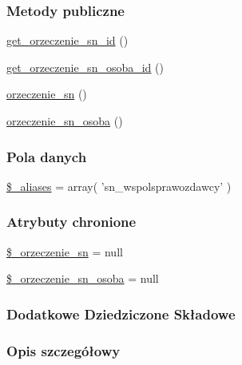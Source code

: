 \subsubsection*{Metody publiczne}
\begin{DoxyCompactItemize}
\item 
\hyperlink{classep___s_n___wspolsprawozdawca_a48819f0e56cb11707ba89150dd449c71}{get\-\_\-orzeczenie\-\_\-sn\-\_\-id} ()
\item 
\hyperlink{classep___s_n___wspolsprawozdawca_a8a91a727290a24c4f12d72adda38d3df}{get\-\_\-orzeczenie\-\_\-sn\-\_\-osoba\-\_\-id} ()
\item 
\hyperlink{classep___s_n___wspolsprawozdawca_ad3ca9a024234af7b90b52e8edb3406ff}{orzeczenie\-\_\-sn} ()
\item 
\hyperlink{classep___s_n___wspolsprawozdawca_abedbfb98ce259de97cc4ddfd5496797c}{orzeczenie\-\_\-sn\-\_\-osoba} ()
\end{DoxyCompactItemize}
\subsubsection*{Pola danych}
\begin{DoxyCompactItemize}
\item 
\hyperlink{classep___s_n___wspolsprawozdawca_ab4e31d75f0bc5d512456911e5d01366b}{\$\-\_\-aliases} = array( 'sn\-\_\-wspolsprawozdawcy' )
\end{DoxyCompactItemize}
\subsubsection*{Atrybuty chronione}
\begin{DoxyCompactItemize}
\item 
\hyperlink{classep___s_n___wspolsprawozdawca_a03da9aa4f10fbe1d2b4ef32521cbedb0}{\$\-\_\-orzeczenie\-\_\-sn} = null
\item 
\hyperlink{classep___s_n___wspolsprawozdawca_a9ede817d229955b98ebe3e10f5a45e94}{\$\-\_\-orzeczenie\-\_\-sn\-\_\-osoba} = null
\end{DoxyCompactItemize}
\subsubsection*{Dodatkowe Dziedziczone Składowe}


\subsubsection{Opis szczegółowy}


